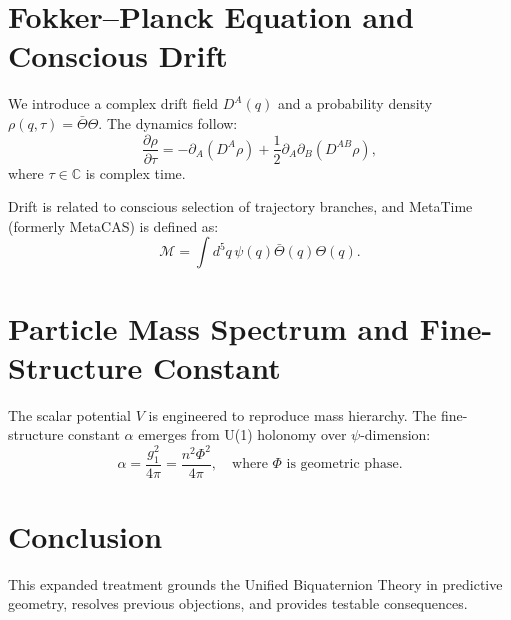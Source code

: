 \documentclass[12pt]{article}
\begin{document}
\section{Fokker--Planck Equation and Conscious Drift}
We introduce a complex drift field \( D^A(q) \) and a probability density \( \rho(q,\tau) = \bar{\Theta} \Theta \). The dynamics follow:
\[ \frac{\partial \rho}{\partial \tau} = -\partial_A ( D^A \rho ) + \frac{1}{2} \partial_A \partial_B (D^{AB} \rho), \]
where \( \tau \in \mathbb{C} \) is complex time.

Drift is related to conscious selection of trajectory branches, and MetaTime (formerly MetaCAS) is defined as:
\[ \mathcal{M} = \int d^5q\, \psi(q) \bar{\Theta}(q) \Theta(q). \]

\section{Particle Mass Spectrum and Fine-Structure Constant}
The scalar potential \( V \) is engineered to reproduce mass hierarchy. The fine-structure constant \( \alpha \) emerges from U(1) holonomy over \( \psi \)-dimension:
\[
\alpha = \frac{g_1^2}{4\pi} = \frac{n^2 \Phi^2}{4\pi}, \quad \text{where } \Phi \text{ is geometric phase.}
\]

\section{Conclusion}
This expanded treatment grounds the Unified Biquaternion Theory in predictive geometry, resolves previous objections, and provides testable consequences.
\end{document}
